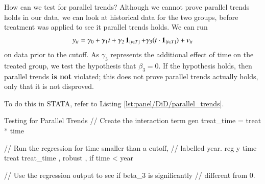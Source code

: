             How can we test for parallel trends? Although we cannot prove parallel trends holds in our data, we can look at historical data for the two groups, before treatment was applied to see it parallel trends holds. We can run
            \begin{align}
                y_{it} = \gamma_0 + \gamma_1 t + \gamma_2 \ind_{i\in T} + \gamma_3(t\cdot\ind_{i\in T}) + v_{it}
            \end{align}
            on data prior to the cutoff. As $\gamma_3$ represents the additional effect of time on the treated group, we test the hypothesis that $\beta_3 = 0$. If the hypothesis holds, then parallel trends \textbf{is not} violated; this does not prove parallel trends actually holds, only that it is not disproved.

            To do this in STATA, refer to Listing \ref{lst:panel/DiD/parallel_trends}.
            \begin{sexylisting}[colback=white, label=lst:panel/DiD/parallel_trends]{Testing for Parallel Trends}
//  Create the interaction term
    gen treat_time = treat * time

//  Run the regression for time smaller than a cutoff, 
//  labelled year.
    reg y time treat treat_time , robust , if time < year 

//  Use the regression output to see if beta_3 is significantly
//  different from 0.
            \end{sexylisting}

